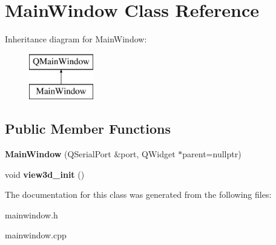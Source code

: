 \hypertarget{class_main_window}{}\section{Main\+Window Class Reference}
\label{class_main_window}
Inheritance diagram for Main\+Window\+:\begin{figure}[H]
\begin{center}
\leavevmode
\includegraphics[height=2.000000cm]{class_main_window}
\end{center}
\end{figure}
\subsection*{Public Member Functions}
\begin{DoxyCompactItemize}
\item 
\mbox{\label{class_main_window_a63f0fa545e945c5a2b2008ff76762f97}} 
{\bfseries Main\+Window} (Q\+Serial\+Port \&port, Q\+Widget $\ast$parent=nullptr)
\item 
\mbox{\label{class_main_window_a0e48dba37c9211e4814a7c2f81b1a11b}} 
void {\bfseries view3d\+\_\+init} ()
\end{DoxyCompactItemize}


The documentation for this class was generated from the following files\+:\begin{DoxyCompactItemize}
\item 
mainwindow.\+h\item 
mainwindow.\+cpp\end{DoxyCompactItemize}
